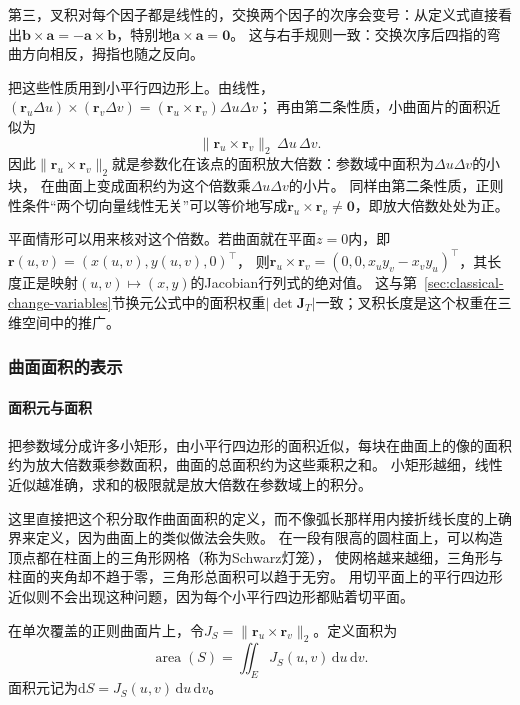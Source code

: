 第三，叉积对每个因子都是线性的，交换两个因子的次序会变号：从定义式直接看出$\bm b\times\bm a=-\bm a\times\bm b$，特别地$\bm a\times\bm a=\bm0$。
这与右手规则一致：交换次序后四指的弯曲方向相反，拇指也随之反向。

把这些性质用到小平行四边形上。由线性，
$(\bm r_u\Delta u)\times(\bm r_v\Delta v)=(\bm r_u\times\bm r_v)\Delta u\Delta v$；
再由第二条性质，小曲面片的面积近似为
\[
 \lVert\bm r_u\times\bm r_v\rVert_2\,\Delta u\,\Delta v.
\]
因此$\lVert\bm r_u\times\bm r_v\rVert_2$就是参数化在该点的面积放大倍数：参数域中面积为$\Delta u\Delta v$的小块，
在曲面上变成面积约为这个倍数乘$\Delta u\Delta v$的小片。
同样由第二条性质，正则性条件“两个切向量线性无关”可以等价地写成$\bm r_u\times\bm r_v\ne\bm0$，即放大倍数处处为正。

平面情形可以用来核对这个倍数。若曲面就在平面$z=0$内，即$\bm r(u,v)=(x(u,v),y(u,v),0)^\top$，
则$\bm r_u\times\bm r_v=(0,0,x_uy_v-x_vy_u)^\top$，其长度正是映射$(u,v)\mapsto(x,y)$的Jacobian行列式的绝对值。
这与第~\ref{sec:classical-change-variables}节换元公式中的面积权重$|\det\bm J_T|$一致；叉积长度是这个权重在三维空间中的推广。

\subsubsection{曲面面积的表示}

\paragraph{面积元与面积}

把参数域分成许多小矩形，由小平行四边形的面积近似，每块在曲面上的像的面积约为放大倍数乘参数面积，曲面的总面积约为这些乘积之和。
小矩形越细，线性近似越准确，求和的极限就是放大倍数在参数域上的积分。

这里直接把这个积分取作曲面面积的定义，而不像弧长那样用内接折线长度的上确界来定义，因为曲面上的类似做法会失败。
在一段有限高的圆柱面上，可以构造顶点都在柱面上的三角形网格（称为Schwarz灯笼），
使网格越来越细，三角形与柱面的夹角却不趋于零，三角形总面积可以趋于无穷。
用切平面上的平行四边形近似则不会出现这种问题，因为每个小平行四边形都贴着切平面。

\begin{definition}[曲面面积]
\label{def:analysis-surface-area-measure}
在单次覆盖的正则曲面片上，令$J_S=\|\bm r_u\times\bm r_v\|_2$。定义面积为
\[
 \operatorname{area}(S)=\iint_E J_S(u,v)\,\mathrm du\,\mathrm dv.
\]
面积元记为$\mathrm dS=J_S(u,v)\,\mathrm du\,\mathrm dv$。
\end{definition}

